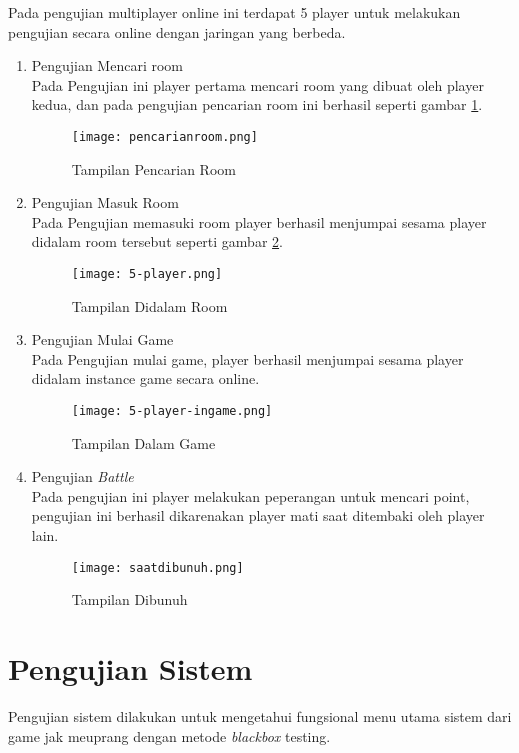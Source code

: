Pada pengujian multiplayer online ini terdapat 5 player untuk melakukan pengujian secara online dengan jaringan yang berbeda.
\begin{enumerate}
    \item Pengujian Mencari room \\
    Pada Pengujian ini player pertama mencari room yang dibuat oleh player kedua, dan pada pengujian pencarian room ini berhasil seperti gambar \ref{fig:pencarianroom}. 
    \begin{figure}[h]
        \centering
        \texttt{[image: pencarianroom.png]}
        \caption{Tampilan Pencarian Room}
        \label{fig:pencarianroom}
    \end{figure}
    \item Pengujian Masuk Room \\
    Pada Pengujian memasuki room player berhasil menjumpai sesama player didalam room tersebut seperti gambar \ref{fig:didalamroom}.
    \newpage
    \begin{figure}[h]
        \centering
        \texttt{[image: 5-player.png]}
        \caption{Tampilan Didalam Room}
        \label{fig:didalamroom}
    \end{figure}
    \item Pengujian Mulai Game \\
    Pada Pengujian mulai game, player berhasil menjumpai sesama player didalam instance game secara online.
    \begin{figure}[h]
        \centering
        \texttt{[image: 5-player-ingame.png]}
        \caption{Tampilan Dalam Game}
        \label{fig:dalamgame}
    \end{figure}
    \item Pengujian \textit{Battle} \\
    Pada pengujian ini player melakukan peperangan untuk mencari point, pengujian ini berhasil dikarenakan player mati saat ditembaki oleh player lain.
    \newpage
    \begin{figure}[h]
        \centering
        \texttt{[image: saatdibunuh.png]}
        \caption{Tampilan Dibunuh}
        \label{fig:dibunuh}
    \end{figure}
\end{enumerate}
\newpage
\section{Pengujian Sistem}
\noindent

Pengujian sistem dilakukan untuk mengetahui fungsional menu utama sistem dari game jak meuprang dengan metode \textit{blackbox} testing.
